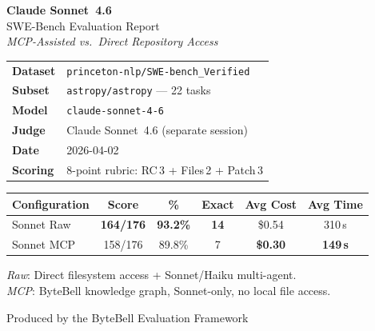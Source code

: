 \documentclass[11pt, a4paper]{article}
\begin{document}
\begin{titlepage}
\centering
\vspace*{3cm}

{\Huge\bfseries Claude Sonnet~4.6}\\[0.6em]
{\LARGE SWE-Bench Evaluation Report}\\[2em]

{\large\itshape MCP-Assisted vs.\ Direct Repository Access}\\[3em]

\begin{tabular}{ll}
\textbf{Dataset}   & \texttt{princeton-nlp/SWE-bench\_Verified} \\[0.3em]
\textbf{Subset}    & \texttt{astropy/astropy} --- 22 tasks \\[0.3em]
\textbf{Model}     & \texttt{claude-sonnet-4-6} \\[0.3em]
\textbf{Judge}     & Claude Sonnet~4.6 (separate session) \\[0.3em]
\textbf{Date}      & 2026-04-02 \\[0.3em]
\textbf{Scoring}   & 8-point rubric: RC\,3 + Files\,2 + Patch\,3 \\
\end{tabular}

\vfill

\begin{table}[h]
\centering
\begin{tabular}{lccccc}
\toprule
\textbf{Configuration} & \textbf{Score} & \textbf{\%} & \textbf{Exact} & \textbf{Avg Cost} & \textbf{Avg Time} \\
\midrule
Sonnet Raw & \textbf{164/176} & \textbf{93.2\%} & \textbf{14} & \$0.54 & 310\,s \\
Sonnet MCP & 158/176 & 89.8\% & 7 & \textbf{\$0.30} & \textbf{149\,s} \\
\bottomrule
\end{tabular}
\end{table}

{\small
\textit{Raw}: Direct filesystem access + Sonnet/Haiku multi-agent.\\
\textit{MCP}: ByteBell knowledge graph, Sonnet-only, no local file access.
}

\vspace{2cm}
{\small Produced by the ByteBell Evaluation Framework}

\end{titlepage}

\tableofcontents
\clearpage
\end{document}
